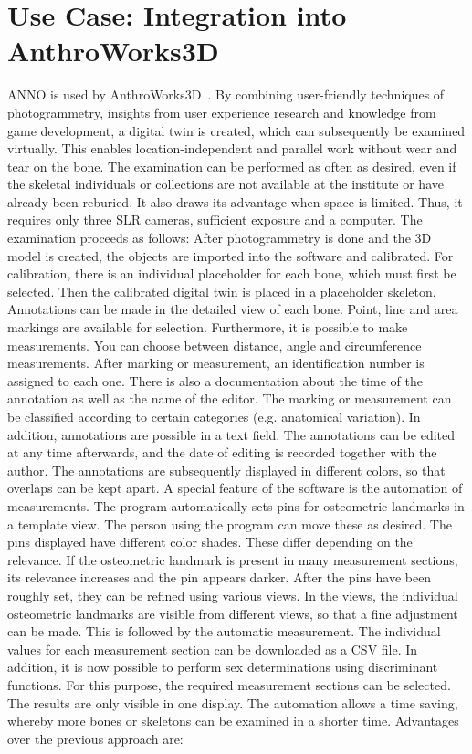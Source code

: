 \documentclass[sw]{iosart2x}
\newcommand{\aw}{AnthroWorks3D}
\begin{document}
\section{Use Case: Integration into \aw{}}
ANNO is used by \aw{}~\citep{anthroworks3d}.
By combining user-friendly techniques of photogrammetry, insights from user experience research and knowledge from game development, a digital twin is created, which can subsequently be examined virtually.
This enables location-independent and parallel work without wear and tear on the bone.
The examination can be performed as often as desired, even if the skeletal individuals or collections are not available at the institute or have already been reburied.
It also draws its advantage when space is limited.
Thus, it requires only three SLR cameras, sufficient exposure and a computer.
The examination proceeds as follows: After photogrammetry is done and the 3D model is created, the objects are imported into the software and calibrated.
For calibration, there is an individual placeholder for each bone, which must first be selected.
Then the calibrated digital twin is placed in a placeholder skeleton.
Annotations can be made in the detailed view of each bone.
Point, line and area markings are available for selection.
Furthermore, it is possible to make measurements.
You can choose between distance, angle and circumference measurements.
After marking or measurement, an identification number is assigned to each one.
There is also a documentation about the time of the annotation as well as the name of the editor.
The marking or measurement can be classified according to certain categories (e.g. anatomical variation).
In addition, annotations are possible in a text field.
The annotations can be edited at any time afterwards, and the date of editing is recorded together with the author.
The annotations are subsequently displayed in different colors, so that overlaps can be kept apart.
A special feature of the software is the automation of measurements.
The program automatically sets pins for osteometric landmarks in a template view.
The person using the program can move these as desired.
The pins displayed have different color shades.
These differ depending on the relevance.
If the osteometric landmark is present in many measurement sections, its relevance increases and the pin appears darker.
After the pins have been roughly set, they can be refined using various views.
In the views, the individual osteometric landmarks are visible from different views, so that a fine adjustment can be made.
This is followed by the automatic measurement.
The individual values for each measurement section can be downloaded as a CSV file.
In addition, it is now possible to perform sex determinations using discriminant functions.
For this purpose, the required measurement sections can be selected.
The results are only visible in one display.
The automation allows a time saving, whereby more bones or skeletons can be examined in a shorter time.
Advantages over the previous approach are:
\end{document}
